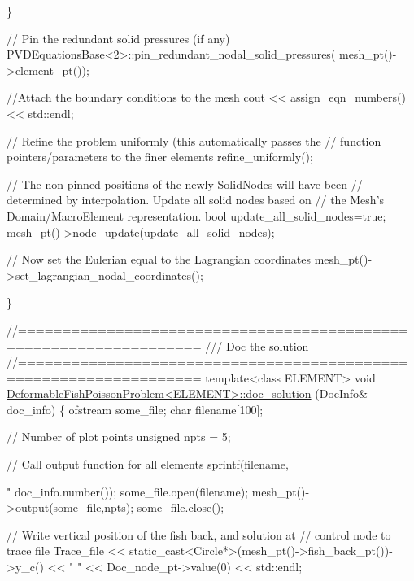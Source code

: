 \begin{DoxyCodeInclude}
  \}

 \textcolor{comment}{// Pin the redundant solid pressures (if any)}
 PVDEquationsBase<2>::pin\_redundant\_nodal\_solid\_pressures(
  mesh\_pt()->element\_pt());

 \textcolor{comment}{//Attach the boundary conditions to the mesh}
 cout << assign\_eqn\_numbers() << std::endl; 

 \textcolor{comment}{// Refine the problem uniformly (this automatically passes the}
 \textcolor{comment}{// function pointers/parameters to the finer elements}
 refine\_uniformly();

 \textcolor{comment}{// The non-pinned positions of the newly SolidNodes will have been}
 \textcolor{comment}{// determined by interpolation. Update all solid nodes based on }
 \textcolor{comment}{// the Mesh's Domain/MacroElement representation.}
 \textcolor{keywordtype}{bool} update\_all\_solid\_nodes=\textcolor{keyword}{true};
 mesh\_pt()->node\_update(update\_all\_solid\_nodes);

 \textcolor{comment}{// Now set the Eulerian equal to the Lagrangian coordinates}
 mesh\_pt()->set\_lagrangian\_nodal\_coordinates();
 
\} 


\textcolor{comment}{//==================================================================}\textcolor{comment}{}
\textcolor{comment}{/// Doc the solution}
\textcolor{comment}{}\textcolor{comment}{//==================================================================}
\textcolor{keyword}{template}<\textcolor{keyword}{class} ELEMENT>
\textcolor{keywordtype}{void} \hyperlink{classDeformableFishPoissonProblem_aee9b59f35d1ae98cda29fba0c01b226a}{DeformableFishPoissonProblem<ELEMENT>::doc\_solution}
      (DocInfo& doc\_info)
\{
 ofstream some\_file;
 \textcolor{keywordtype}{char} filename[100];

 \textcolor{comment}{// Number of plot points}
 \textcolor{keywordtype}{unsigned} npts = 5; 

 \textcolor{comment}{// Call output function for all elements}
 sprintf(filename,\textcolor{stringliteral}{"%
         doc\_info.number());
 some\_file.open(filename);
 mesh\_pt()->output(some\_file,npts);
 some\_file.close();


 \textcolor{comment}{// Write vertical position of the fish back, and solution at }
 \textcolor{comment}{// control node to trace file}
 Trace\_file 
  << \textcolor{keyword}{static\_cast<}Circle*\textcolor{keyword}{>}(mesh\_pt()->fish\_back\_pt())->y\_c()
  << \textcolor{stringliteral}{" "} << Doc\_node\_pt->value(0) << std::endl;

}
\end{DoxyCodeInclude}
